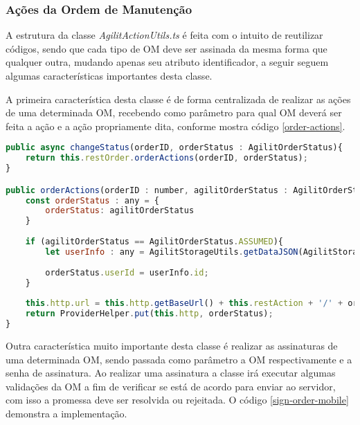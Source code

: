 \subsubsection{Ações da Ordem de Manutenção}
A estrutura da classe \textit{AgilitActionUtils.ts} é feita com o intuito de reutilizar códigos, sendo que cada tipo de OM deve ser assinada da mesma forma que qualquer outra, mudando apenas seu atributo identificador, a seguir seguem algumas características importantes desta classe.

A primeira característica desta classe é de forma centralizada de realizar as ações de uma determinada OM, recebendo como parâmetro para qual OM deverá ser feita a ação e a ação propriamente dita, conforme mostra código \ref{order-actions}.

\begin{lstlisting}[language=JavaScript, caption={Alterar situação da ordem de manutenção}, label={order-actions}]
public async changeStatus(orderID, orderStatus : AgilitOrderStatus){    
	return this.restOrder.orderActions(orderID, orderStatus);
}

public orderActions(orderID : number, agilitOrderStatus : AgilitOrderStatus){
	const orderStatus : any = {
		orderStatus: agilitOrderStatus        
	}
	
	if (agilitOrderStatus == AgilitOrderStatus.ASSUMED){
		let userInfo : any = AgilitStorageUtils.getDataJSON(AgilitStorageTypes.USERDATA);
		
		orderStatus.userId = userInfo.id;
	}    
	
	this.http.url = this.http.getBaseUrl() + this.restAction + '/' + orderID + '/status';
	return ProviderHelper.put(this.http, orderStatus);
}

\end{lstlisting}

Outra característica muito importante desta classe é realizar as assinaturas de uma determinada OM, sendo passada como parâmetro a OM respectivamente e a senha de assinatura. Ao realizar uma assinatura a classe irá executar algumas validações da OM a fim de verificar se está de acordo para enviar ao servidor, com isso a promessa deve ser resolvida ou rejeitada.
O código \ref{sign-order-mobile} demonstra a implementação.

